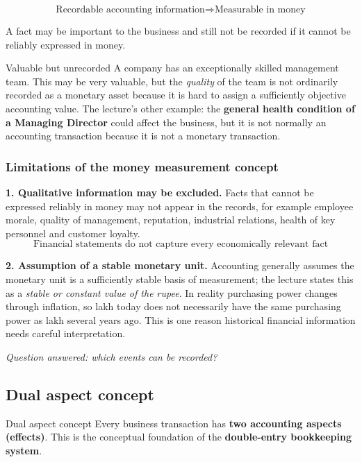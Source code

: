 \documentclass[11pt,a4paper]{article}
\newcommand{\Rs}{\ifmmode\text{\rsfont ₹}\else{\rsfont ₹}\fi}
\begin{document}
\[
\boxed{\text{Recordable accounting information}\Rightarrow\text{Measurable in money}}
\]

A fact may be important to the business and still not be recorded if it cannot be reliably expressed in money.

\begin{exbox}{Valuable but unrecorded}
A company has an exceptionally skilled management team. This may be very valuable, but the \emph{quality} of the team
is not ordinarily recorded as a monetary asset because it is hard to assign a sufficiently objective accounting value.
The lecture's other example: the \textbf{general health condition of a Managing Director} could affect the business,
but it is not normally an accounting transaction because it is not a monetary transaction.
\end{exbox}

\subsubsection{Limitations of the money measurement concept}

\textbf{1. Qualitative information may be excluded.} Facts that cannot be expressed reliably in money may not appear
in the records, for example employee morale, quality of management, reputation, industrial relations, health of key
personnel and customer loyalty.
\[
\boxed{\text{Financial statements do not capture every economically relevant fact}}
\]

\textbf{2. Assumption of a stable monetary unit.} Accounting generally assumes the monetary unit is a sufficiently
stable basis of measurement; the lecture states this as a \emph{stable or constant value of the rupee}. In reality
purchasing power changes through inflation, so \Rs 1 lakh today does not necessarily have the same purchasing power as
\Rs 1 lakh several years ago. This is one reason historical financial information needs careful interpretation.

\begin{keybox}
\emph{Question answered: which events can be recorded?}
\end{keybox}

\subsection{Dual aspect concept}

\begin{defbox}{Dual aspect concept}
Every business transaction has \textbf{two accounting aspects (effects)}. This is the conceptual foundation of the
\textbf{double-entry bookkeeping system}.
\end{defbox}
\end{document}
